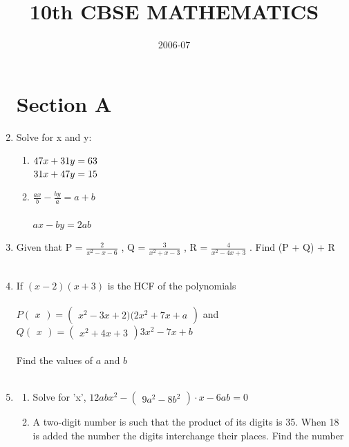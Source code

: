 \documentclass[journal,12pt,twocolumn]{IEEEtran}
\title{10th CBSE MATHEMATICS}
\author{2006-07}
\newcommand{\myvec}[1]{\ensuremath{\begin{pmatrix}#1\end{pmatrix}}}
\begin{document}
\begin{enumerate}[label=1.\arabic*]
\maketitle
\section{Section A}
\item Solve for x and y: \\
\begin{enumerate}
    \item $47x + 31y = 63\\$\\
    $31x + 47y = 15\\$\\
    \item $\frac{ax}{b}  - \frac{by}{a}  = a+b$\\
    \vspace{1mm}\\
    $ ax - by = 2ab $\\
\end{enumerate}
\item Given that P = $ \frac{2}{x^2 - x - 6}$ , Q = $ \frac{3}{x^2 + x - 3 }$ , R = $ \frac{4}{x^2 - 4x + 3}$ 
. Find (P + Q) + R\\
\vspace{5mm}\\
\item If $ (x-2)(x+3) $ is the HCF of the polynomials\\
\vspace{2mm}\\
$ P\myvec{x} = \myvec{x^2 - 3x + 2)(2x^2 + 7x + a}$  and\\
$ Q\myvec{x} = \myvec{x^2 + 4x + 3}{3x^2 - 7x + b}$\\
\vspace{2mm}\\
Find the values of $a$ and $b$\\
\vspace{5mm}\\
\item
\begin{enumerate}
    \item Solve for 'x', $ 12abx^2 - \myvec{9a^2 - 8b^2} \cdot x - 6ab = 0 $\\
    \item A two-digit number is such that the product of its digits is 35. When 18 is added the number the digits interchange their places. Find the number\\
\end{enumerate}



\end{enumerate}
\end{document}
